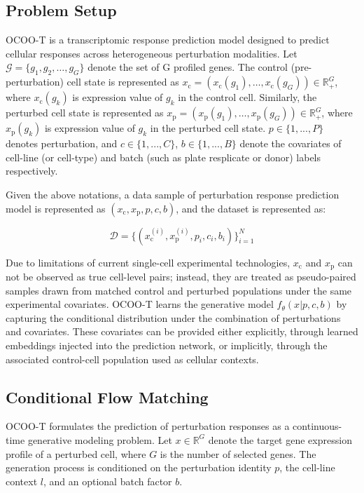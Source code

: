 \documentclass[11pt]{article}
\begin{document}
\subsection{Problem Setup}
OCOO-T is a transcriptomic response prediction model designed to predict cellular responses across heterogeneous perturbation modalities. Let $\mathcal{G} = \{g_1, g_2, \ldots, g_G\}$ denote the set of G profiled genes. The control (pre-perturbation) cell state is represented as $x_{\mathrm{c}} = (x_{\mathrm{c}}(g_1), \ldots, x_{\mathrm{c}}(g_G)) \in \mathbb{R}_{+}^{G}$, where $x_{\mathrm{c}}(g_k)$ is expression value of $g_k$ in the control cell. Similarly, the perturbed cell state is represented as $x_{\mathrm{p}} = (x_{\mathrm{p}}(g_1), \ldots, x_{\mathrm{p}}(g_G)) \in \mathbb{R}_{+}^{G}$, where $x_{\mathrm{p}}(g_k)$ is expression value of $g_k$ in the perturbed cell state. $p \in \{1,...,P\}$ denotes perturbation, and $c \in \{1,...,C\}$, $b \in \{1,...,B\}$ denote the covariates of cell-line (or cell-type) and batch (such as plate resplicate or donor) labels respectively.

Given the above notations, a data sample of perturbation response prediction model is represented as $(x_{\mathrm{c}}, x_{\mathrm{p}}, p, c, b)$, and the dataset is represented as:

\begin{equation}
  \mathcal{D}=\{ (x_{\mathrm{c}}^{(i)}, x_{\mathrm{p}}^{(i)}, p_i, c_i, b_i)\}_{i=1}^N
\end{equation}

Due to limitations of current single-cell experimental technologies, $x_{\mathrm{c}}$ and $x_{\mathrm{p}}$ can not be observed as true cell-level pairs; instead, they are treated as pseudo-paired samples drawn from matched control and perturbed populations under the same experimental covariates. OCOO-T learns the generative model $f_{\theta}(x|p, c, b)$ by capturing the conditional distribution under the combination of perturbations and covariates. These covariates can be provided either explicitly, through learned embeddings injected into the prediction network, or implicitly, through the associated control-cell population used as cellular contexts.

\subsection{Conditional Flow Matching}
OCOO-T formulates the prediction of perturbation responses as a continuous-time generative modeling problem. Let $x \in \mathbb{R}^{G}$ denote the target gene expression profile of a perturbed cell, where $G$ is the number of selected genes. The generation process is conditioned on the perturbation identity $p$, the cell-line context $l$, and an optional batch factor $b$.
\end{document}
